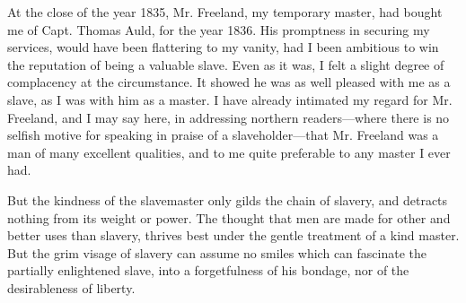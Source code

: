At the close of the year 1835, Mr. Freeland, my temporary master, had
bought me of Capt. Thomas Auld, for the year 1836. His promptness in
securing my services, would have been flattering to my vanity, had I
been ambitious to win the reputation of being a valuable slave. Even as
it was, I felt a slight degree of complacency at the circumstance. It
showed he was as well pleased with me as a slave, as I was with him as a
master. I have already intimated my regard for Mr. Freeland, and I may
say here, in addressing northern readers---where there is no selfish
motive for speaking in praise of a slaveholder---that Mr. Freeland was a
man of many excellent qualities, and to me quite preferable to any
master I ever had.

But the kindness of the slavemaster only gilds the chain of slavery, and
detracts nothing from its weight or power. The thought that men are made
for other {\protect\hypertarget{273}{}{}}and better uses than slavery,
thrives best under the gentle treatment of a kind master. But the grim
visage of slavery can assume no smiles which can fascinate the partially
enlightened slave, into a forgetfulness of his bondage, nor of the
desirableness of liberty.

